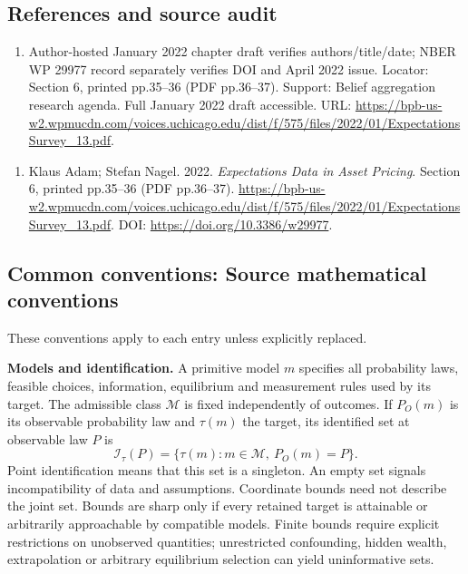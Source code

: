 \documentclass[11pt,a4paper]{article}
\begin{document}
\subsection*{References and source audit}
\begin{enumerate}
\item Author-hosted January 2022 chapter draft verifies authors/title/date; NBER WP 29977 record separately verifies DOI and April 2022 issue. Locator: Section 6, printed pp.35--36 (PDF pp.36--37). Support: Belief aggregation research agenda. Full January 2022 draft accessible. URL: \url{https://bpb-us-w2.wpmucdn.com/voices.uchicago.edu/dist/f/575/files/2022/01/ExpectationsSurvey_13.pdf}.
\end{enumerate}
\begin{enumerate}\raggedright
\item\hypertarget{definitions:source:30007595:1}{} Klaus Adam; Stefan Nagel. 2022. \emph{Expectations Data in Asset Pricing}. Section 6, printed pp.35--36 (PDF pp.36--37).
\url{https://bpb-us-w2.wpmucdn.com/voices.uchicago.edu/dist/f/575/files/2022/01/ExpectationsSurvey_13.pdf}.
DOI: \url{https://doi.org/10.3386/w29977}.
\end{enumerate}

\subsection*{Common conventions: Source mathematical conventions}

These conventions apply to each entry unless explicitly replaced.

\textbf{Models and identification.} A primitive model \(m\) specifies all probability laws, feasible choices, information, equilibrium and measurement rules used by its target. The admissible class \(\mathcal M\) is fixed independently of outcomes. If \(P_O(m)\) is its observable probability law and \(\tau(m)\) the target, its identified set at observable law \(P\) is
\[
 \mathcal I_\tau(P)=\{\tau(m):m\in\mathcal M,\ P_O(m)=P\}.
\]
Point identification means that this set is a singleton. An empty set signals incompatibility of data and assumptions. Coordinate bounds need not describe the joint set. Bounds are sharp only if every retained target is attainable or arbitrarily approachable by compatible models. Finite bounds require explicit restrictions on unobserved quantities; unrestricted confounding, hidden wealth, extrapolation or arbitrary equilibrium selection can yield uninformative sets.
\end{document}
